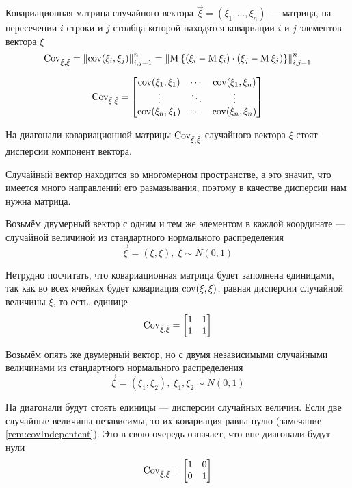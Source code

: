 \begin{definition}
  \label{def:vectorCovMatrix}

  Ковариационная матрица случайного вектора
  $\vec{\xi} = \left( \xi_1, \dots, \xi_n \right)$ --- матрица, на пересечении
  $i$ строки и $j$ столбца которой находятся ковариации $i$ и $j$ элементов
  вектора $\xi$
  $$\operatorname{Cov^{}_{\vec{\xi}, \vec{\xi}}}
      = \left\| \operatorname{cov}\!\left( \xi_i, \xi_j \right) \right\|_{i,j=1}^n
      = \left\| \operatorname{M}_{} 
      \left\{ \left( \xi_i - \operatorname{M}_{} \xi_i \right)
          \cdot \left( \xi_j - \operatorname{M}_{} \xi_j \right)
      \right\} \right\|_{i,j=1}^n$$

  $$\operatorname{Cov^{}_{\vec{\xi}, \vec{\xi}}} =
  \begin{bmatrix}
      \operatorname{cov}\!\left( \xi_1, \xi_1 \right) & \cdots & \operatorname{cov}\!\left( \xi_1, \xi_n \right) \\
      \vdots & \ddots & \vdots \\
      \operatorname{cov}\!\left( \xi_n, \xi_1 \right) & \cdots & \operatorname{cov}\!\left( \xi_n, \xi_n \right)
  \end{bmatrix}$$

\end{definition}

\begin{remark}
  На диагонали ковариационной матрицы $\operatorname{Cov^{}_{\vec{\xi}, \vec{\xi}}}$
  случайного вектора $\xi$ стоят дисперсии компонент вектора.
\end{remark}

Случайный вектор находится во многомерном пространстве, а это значит,
что имеется много направлений его размазывания, поэтому в качестве дисперсии
нам нужна матрица.

\begin{example}
  Возьмём двумерный вектор с одним и тем же элементом
  в каждой координате --- случайной величиной из стандартного нормального
  распределения
  $$\vec{\xi} = \left( \xi, \xi \right),\; \xi \sim N\left( 0, 1 \right)$$

  Нетрудно посчитать, что ковариационная матрица будет заполнена единицами,
  так как во всех ячейках будет ковариация $\operatorname{cov}\!\left( \xi, \xi \right)$, равная
  дисперсии случайной величины $\xi$, то есть, единице
  $$\operatorname{Cov^{}_{\vec{\xi}, \vec{\xi}}} =
  \begin{bmatrix}
      1 & 1 \\
      1 & 1
  \end{bmatrix}$$
\end{example}

\begin{example}
  Возьмём опять же двумерный вектор, но с двумя независимыми
  случайными величинами из стандартного нормального распределения
  $$\vec{\xi} = \left( \xi_1, \xi_2 \right),\;
      \xi_1, \xi_2 \sim N\left( 0, 1 \right)$$

  На диагонали будут стоять единицы --- дисперсии случайных величин.
  Если две случайные величины независимы, то их ковариация равна нулю
  (замечание \ref{rem:covIndepentent}).
  Это в свою очередь означает, что вне диагонали
  будут нули
  $$\operatorname{Cov^{}_{\vec{\xi}, \vec{\xi}}} =
  \begin{bmatrix}
      1 & 0 \\
      0 & 1
  \end{bmatrix}$$
\end{example}

